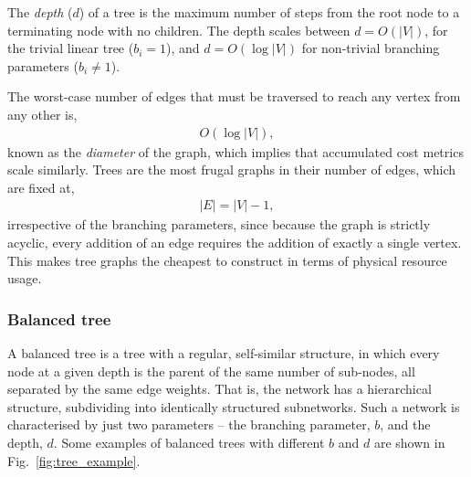 The \textit{depth} ($d$) of a tree is the maximum number of steps from the root node to a terminating node with no children. The depth scales between \mbox{$d=O(|V|)$}, for the trivial linear tree (\mbox{$b_i=1$}), and \mbox{$d=O(\log |V|)$} for non-trivial branching parameters (\mbox{$b_i\neq 1$}).

The worst-case number of edges that must be traversed to reach any vertex from any other is,
\begin{align}
	O(\log|V|),
\end{align}
known as the \textit{diameter} of the graph, which implies that accumulated cost metrics scale similarly. Trees are the most frugal graphs in their number of edges, which are fixed at,
\begin{align}
	|E|=|V|-1,
\end{align}
irrespective of the branching parameters, since because the graph is strictly acyclic, every addition of an edge requires the addition of exactly a single vertex. This makes tree graphs the cheapest to construct in terms of physical resource usage.

%
%

\subsubsection{Balanced tree} \label{sec:bal_tree} 

A balanced tree is a tree with a regular, self-similar structure, in which every node at a given depth is the parent of the same number of sub-nodes, all separated by the same edge weights. That is, the network has a hierarchical structure, subdividing into identically structured subnetworks. Such a network is characterised by just two parameters -- the branching parameter, $b$, and the depth, $d$. Some examples of balanced trees with different $b$ and $d$ are shown in Fig.~\ref{fig:tree_example}.


